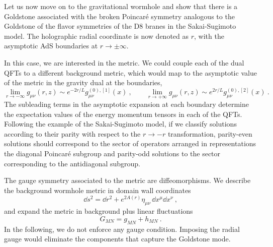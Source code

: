 Let us now move on to the gravitational wormhole and show that there is a Goldstone associated with the broken Poincar\'e symmetry analogous to the Goldstone of the flavor symmetries of the D8 branes in the Sakai-Sugimoto model. The holographic radial coordinate is now denoted as $r$, with the asymptotic AdS boundaries at $r\to \pm\infty$.

In this case, we are interested in the metric. We could couple each of the dual QFTs to a different background metric, which would map to the asymptotic value of the metric in the gravity dual at the boundaries,
\begin{equation}
	\lim_{r\to-\infty} g_{\mu\nu}(r,z)\sim e^{-2r/L}g^{(0),[1]}_{\mu\nu}(x)
	\ ,\qquad
	\lim_{r\to+\infty} g_{\mu\nu}(r,z)\sim e^{2r/L}g^{(0),[2]}_{\mu\nu}(x)\ .
\end{equation}
The subleading terms in the asymptotic expansion at each boundary determine the expectation values of the energy momentum tensors in each of the QFTs. Following the example of the Sakai-Sugimoto model, if we classify solutions according to their parity with respect to the $r\to -r$ transformation, parity-even solutions should correspond to the sector of operators arranged in representations the diagonal Poincar\'e subgroup and parity-odd solutions to the sector corresponding to the antidiagonal subgroup. 

The gauge symmetry associated to the metric are diffeomorphisms. 
We describe the background wormhole metric in domain wall coordinates
\begin{equation}
	\dd s^2
	=
	\dd r^2+e^{2A(r)}\eta_{\mu\nu}\,\dd x^\mu \dd x^\nu\ ,
\end{equation}
and expand the metric in background plus linear fluctuations
\begin{equation}
	G_{MN}=g_{MN}+h_{MN}\ .
\end{equation}
In the following, we do not enforce any gauge condition. Imposing the radial gauge would eliminate the components that capture the Goldstone mode.


